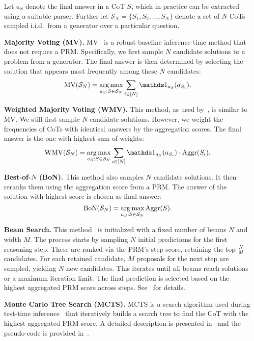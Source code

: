 Let $a_S$ denote the final answer in a CoT $S$, which in practice can be extracted using a suitable parser. Further let $\mathcal{S}_N =\{S_1, S_2, \dots, S_N\}$ denote a set of $N$ CoTs sampled i.i.d.~from a generator over a particular question.


\textbf{Majority Voting (MV).}
MV~\citep{wang2022self} is a robust baseline inference-time method that does not require a PRM. Specifically, we first sample $N$ candidate solutions to a problem from a generator. The final answer is then determined by selecting the solution that appears most frequently among these $N$ candidates:
\[\text{MV}(\mathcal{S}_N) = \argmax_{a_S: S \in \mathcal{S}_N} \sum_{i\in[N]} \mathds 1_{a_S}(a_{S_i}).\]


\textbf{Weighted Majority Voting (WMV).}
This method, as used by~\citet{uesato2022solving},
is similar to MV.
We still first sample $N$ candidate solutions.
However, we weight the frequencies of CoTs with identical answers by the aggregation scores. The final answer is the one with highest sum of weights:
\[\text{WMV}(\mathcal{S}_N) = \argmax_{a_S: S \in \mathcal{S}_N} \sum_{i \in [N]} \mathds 1_{a_S}(a_{S_i}) \cdot \text{Aggr}(S_i).\]


\textbf{Best-of-$N$ (BoN).}
This method also samples $N$ candidate solutions. It then reranks them using the aggregation score from a PRM. The answer of the solution with highest score is chosen as final answer:
\[\text{BoN}(\mathcal{S}_N) = \operatorname*{arg\,max}_{a_S: S \in \mathcal{S}_N} \text{Aggr}(S).\]


\textbf{Beam Search.}
This method~\citep{snell2024scaling} is initialized with a fixed number of beams $N$ and width $M$. The process starts by sampling $N$ initial predictions for the first reasoning step. These are ranked via the PRM’s step score, retaining the top $\frac{N}{M}$ candidates. For each retained candidate, $M$ proposals for the next step are sampled, yielding $N$ new candidates. This iterates until all beams reach solutions or a maximum iteration limit. The final prediction is selected based on the highest aggregated PRM score across steps. See~ for details.




\textbf{Monte Carlo Tree Search (MCTS).}
MCTS is a search algorithm used during test-time inference~\citep{hao2023reasoning,feng2023alphazero} that iteratively builds a search tree to find the CoT with the highest aggregated PRM score.
A detailed description is presented in~ and the pseudo-code is provided in~.
